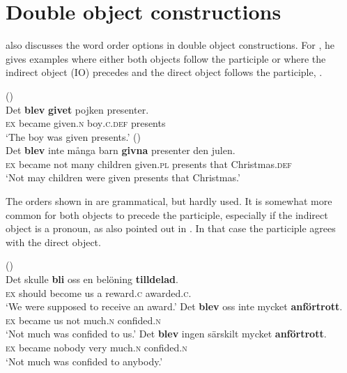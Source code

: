 \documentclass[output=paper]{LSP/langsci}
\begin{document}
\section{Double object constructions}
\citet{Holmberg2002Expletives} also discusses the word order options in double object constructions. For , he gives examples where either both objects follow the participle  or where the indirect object (IO) precedes and the direct object follows the participle,  .

\ea%
    \label{ex:engdahl:23}
    \ea \label{ex:engdahl:23a}
     (\citealt[87]{Holmberg2002Expletives})
    \\
\gll    Det   \textbf{blev}  \textbf{givet}     pojken     presenter.\\
     \textsc{ex}    became   given.\textsc{n}  boy\textsc{.c.def} presents\\
     \glt ‘The boy was given presents.'
\ex \label{ex:engdahl:23b}
 (\citealt[114]{Holmberg2002Expletives})\\
\gll     Det   \textbf{blev}  inte   många barn  \textbf{givna}     presenter den   julen.  \\
         \textsc{ex}    became  not    many  children  given.\textsc{pl}  presents    that Christmas.\textsc{def}\\
         \glt ‘Not may children were given presents that  Christmas.'
\z
\z

\noindent The orders shown in  are grammatical, but hardly used. It is somewhat more common for both objects to precede the participle, especially if the indirect object is a pronoun, as also pointed out in \citet{börjarsvincent}. In that case the participle agrees with the direct object.

\ea%
    \label{ex:engdahl:24}
     (\citealt[4:387]{TelemanEtAl1999})\\
    \ea
\gll  Det   skulle   \textbf{bli}    oss en belöning   \textbf{tilldelad}.  \\
  \textsc{ex}    should  become  us  a    reward.\textsc{c}  {awarded.}\textsc{c}.\\
  \glt ‘We  were supposed to  receive an award.'
\ex\label{ex:engdahl:24b}
\gll     Det   \textbf{blev}  oss inte   mycket     \textbf{anförtrott}.\\
  \textsc{ex}    became us    not    much.\textsc{n}    {confided.}\textsc{n}\\
  \glt ‘Not much was  confided to us.'
\ex\label{ex:engdahl:24c}
\gll Det   \textbf{blev}  ingen  särskilt   mycket     \textbf{anförtrott}.\\
  \textsc{ex}    became nobody very much.\textsc{n}    {confided.}\textsc{n}\\
  \glt ‘Not much was confided to anybody.'
\z
\z
\end{document}
